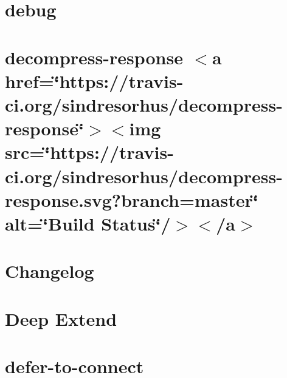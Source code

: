 \let\mypdfximage\pdfximage\def\pdfximage{\immediate\mypdfximage}\documentclass[twoside]{book}
\newcommand{\+}{\discretionary{\mbox{\scriptsize$\hookleftarrow$}}{}{}}
\begin{document}
\chapter{debug}
\label{md__c_1__git_hub__p_r_o_y_e_c_t_o-_i_i_i-_g_o_t_rest-api-node-mysql_node_modules_debug__r_e_a_d_m_e}

\chapter{decompress-\/response $<$a href=\char`\"{}https\+://travis-\/ci.\+org/sindresorhus/decompress-\/response\char`\"{}$>$$<$img src=\char`\"{}https\+://travis-\/ci.\+org/sindresorhus/decompress-\/response.\+svg?branch=master\char`\"{} alt=\char`\"{}\+Build Status\char`\"{}/$>$$<$/a$>$}
\label{md__c_1__git_hub__p_r_o_y_e_c_t_o-_i_i_i-_g_o_t_rest-api-node-mysql_node_modules_decompress-response_readme}

\chapter{Changelog}
\label{md__c_1__git_hub__p_r_o_y_e_c_t_o-_i_i_i-_g_o_t_rest-api-node-mysql_node_modules_deep-extend__c_h_a_n_g_e_l_o_g}

\chapter{Deep Extend}
\label{md__c_1__git_hub__p_r_o_y_e_c_t_o-_i_i_i-_g_o_t_rest-api-node-mysql_node_modules_deep-extend__r_e_a_d_m_e}

\chapter{defer-\/to-\/connect}
\label{md__c_1__git_hub__p_r_o_y_e_c_t_o-_i_i_i-_g_o_t_rest-api-node-mysql_node_modules_defer-to-connect__r_e_a_d_m_e}

\end{document}
